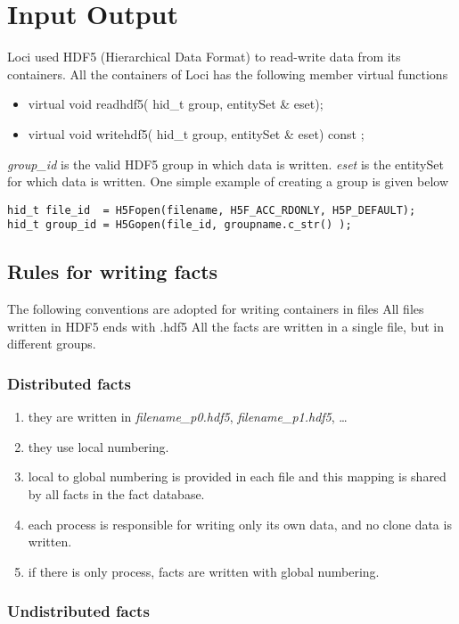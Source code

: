 \chapter {Input Output}
Loci used HDF5 (Hierarchical Data Format)  to read-write data from its 
containers. All the containers of Loci has the following member virtual functions
%
\begin{itemize} 
\item virtual void readhdf5( hid\_t group, entitySet \&  eset);
\item virtual void writehdf5( hid\_t group, entitySet \& eset) const ;
\end{itemize}
%
{\em group\_id} is the valid HDF5 group in which data is written. {\em eset} is
the entitySet for which data is written. One simple example of
creating a group is given below
%
\begin{verbatim} 
hid_t file_id  = H5Fopen(filename, H5F_ACC_RDONLY, H5P_DEFAULT);
hid_t group_id = H5Gopen(file_id, groupname.c_str() );
\end{verbatim} 

\section {Rules for writing facts}
The following conventions are adopted for writing containers in files
All files written in HDF5 ends with .hdf5
All the facts are written in a single file, but in different groups.
\subsection {Distributed facts}
\begin{enumerate}
\item they are written in {\em filename\_p0.hdf5}, {\em filename\_p1.hdf5}, \dots
\item they use local numbering.
\item local to global numbering is provided in each file and this
mapping is shared by all facts in the fact database.
\item each process is responsible for writing only its own data, and
no clone data is written.
\item if there is only process, facts are written with global numbering.
\end{enumerate}

\subsection {Undistributed facts}

